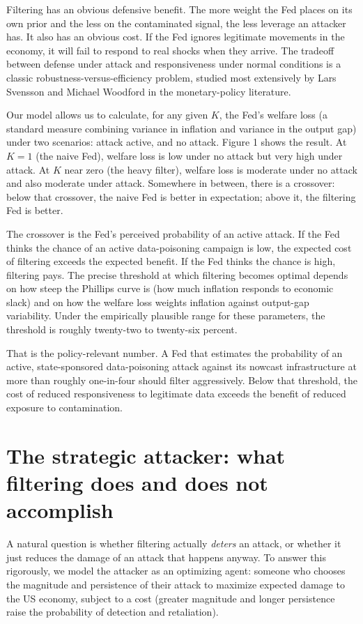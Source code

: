 \documentclass[12pt]{article}
\begin{document}
Filtering has an obvious defensive benefit. The more weight the Fed places on its own prior and the less on the contaminated signal, the less leverage an attacker has. It also has an obvious cost. If the Fed ignores legitimate movements in the economy, it will fail to respond to real shocks when they arrive. The tradeoff between defense under attack and responsiveness under normal conditions is a classic robustness-versus-efficiency problem, studied most extensively by Lars Svensson and Michael Woodford in the monetary-policy literature.

Our model allows us to calculate, for any given $K$, the Fed's welfare loss (a standard measure combining variance in inflation and variance in the output gap) under two scenarios: attack active, and no attack. Figure 1 shows the result. At $K=1$ (the naive Fed), welfare loss is low under no attack but very high under attack. At $K$ near zero (the heavy filter), welfare loss is moderate under no attack and also moderate under attack. Somewhere in between, there is a crossover: below that crossover, the naive Fed is better in expectation; above it, the filtering Fed is better.

The crossover is the Fed's perceived probability of an active attack. If the Fed thinks the chance of an active data-poisoning campaign is low, the expected cost of filtering exceeds the expected benefit. If the Fed thinks the chance is high, filtering pays. The precise threshold at which filtering becomes optimal depends on how steep the Phillips curve is (how much inflation responds to economic slack) and on how the welfare loss weights inflation against output-gap variability. Under the empirically plausible range for these parameters, the threshold is roughly twenty-two to twenty-six percent.

That is the policy-relevant number. A Fed that estimates the probability of an active, state-sponsored data-poisoning attack against its nowcast infrastructure at more than roughly one-in-four should filter aggressively. Below that threshold, the cost of reduced responsiveness to legitimate data exceeds the benefit of reduced exposure to contamination.

\section{The strategic attacker: what filtering does and does not accomplish}

A natural question is whether filtering actually \emph{deters} an attack, or whether it just reduces the damage of an attack that happens anyway. To answer this rigorously, we model the attacker as an optimizing agent: someone who chooses the magnitude and persistence of their attack to maximize expected damage to the US economy, subject to a cost (greater magnitude and longer persistence raise the probability of detection and retaliation).
\end{document}
